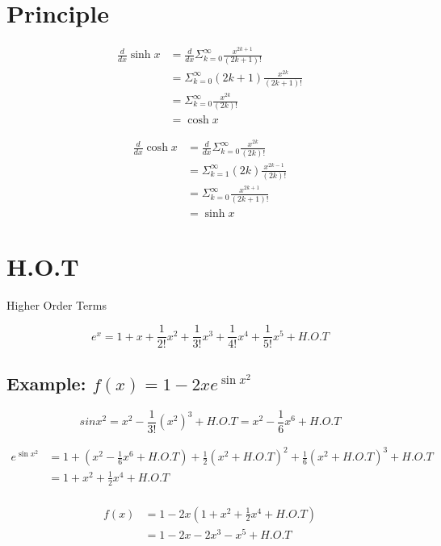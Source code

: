 \documentclass[a4paper,12pt]{article}
\begin{document}
\section{Principle}

\begin{equation}
\begin{split}
\frac{d}{dx}\sinh{x} & = \frac{d}{dx}\Sigma_{k=0}^\infty\frac{x^{2k+1}}{(2k+1)!} \\
 & = \Sigma_{k=0}^\infty(2k+1)\frac{x^{2k}}{(2k+1)!} \\ 
 & = \Sigma_{k=0}^\infty\frac{x^{2k}}{(2k)!} \\ 
 & = \cosh{x}
\end{split}
\end{equation}

\begin{equation}
\begin{split}
\frac{d}{dx}\cosh{x} & = \frac{d}{dx}\Sigma_{k=0}^\infty\frac{x^{2k}}{(2k)!} \\
 & = \Sigma_{k=1}^\infty(2k)\frac{x^{2k-1}}{(2k)!} \\ 
 & = \Sigma_{k=0}^\infty\frac{x^{2k+1}}{(2k+1)!} \\ 
 & = \sinh{x}
\end{split}
\end{equation}

\section{H.O.T}
Higher Order Terms

$$e^x = 1 + x + \frac{1}{2!}x^2 + \frac{1}{3!}x^3 + \frac{1}{4!}x^4 + \frac{1}{5!}x^5 + H.O.T$$

\subsection{Example: $f(x) = 1 - 2xe^{\sin{x^2}}$ }

$$sin{x^2} = x^2 - \frac{1}{3!}(x^2)^3 + H.O.T = x^2 - \frac{1}{6}x^6 + H.O.T$$

\begin{equation}
\begin{split}
e^{\sin{x^2}} & = 1 + (x^2 - \frac{1}{6}x^6 + H.O.T) + \frac{1}{2}(x^2 + H.O.T)^2 + \frac{1}{6}(x^2 + H.O.T)^3 + H.O.T \\
 & = 1 + x^2 + \frac{1}{2}x^4 + H.O.T \\
\end{split}
\end{equation}

\begin{equation}
\begin{split}
f(x) & = 1 - 2x(1 + x^2 + \frac{1}{2}x^4 + H.O.T) \\
 & = 1 - 2x - 2x^3 - x^5 + H.O.T
\end{split}
\end{equation}
\end{document}
